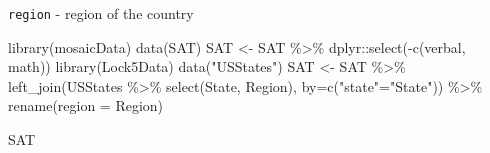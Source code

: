 \documentclass[
  letterpaper,
  DIV=11,
  numbers=noendperiod]{scrreprt}
\newenvironment{Shaded}{\begin{snugshade}}{\end{snugshade}}
\newcommand{\AttributeTok}[1]{\textcolor[rgb]{0.40,0.45,0.13}{#1}}
\newcommand{\FunctionTok}[1]{\textcolor[rgb]{0.28,0.35,0.67}{#1}}
\newcommand{\NormalTok}[1]{\textcolor[rgb]{0.00,0.23,0.31}{#1}}
\newcommand{\OtherTok}[1]{\textcolor[rgb]{0.00,0.23,0.31}{#1}}
\newcommand{\SpecialCharTok}[1]{\textcolor[rgb]{0.37,0.37,0.37}{#1}}
\newcommand{\StringTok}[1]{\textcolor[rgb]{0.13,0.47,0.30}{#1}}
\begin{document}
\texttt{region} - region of the country

\begin{Shaded}
\begin{Highlighting}[]
\FunctionTok{library}\NormalTok{(mosaicData)}
\FunctionTok{data}\NormalTok{(SAT)}
\NormalTok{SAT }\OtherTok{\textless{}{-}}\NormalTok{ SAT }\SpecialCharTok{\%\textgreater{}\%}\NormalTok{ dplyr}\SpecialCharTok{::}\FunctionTok{select}\NormalTok{(}\SpecialCharTok{{-}}\FunctionTok{c}\NormalTok{(verbal, math))}
\FunctionTok{library}\NormalTok{(Lock5Data)}
\FunctionTok{data}\NormalTok{(}\StringTok{"USStates"}\NormalTok{)}
\NormalTok{SAT }\OtherTok{\textless{}{-}}\NormalTok{ SAT }\SpecialCharTok{\%\textgreater{}\%} \FunctionTok{left\_join}\NormalTok{(USStates }\SpecialCharTok{\%\textgreater{}\%} \FunctionTok{select}\NormalTok{(State, Region), }\AttributeTok{by=}\FunctionTok{c}\NormalTok{(}\StringTok{"state"}\OtherTok{=}\StringTok{"State"}\NormalTok{)) }\SpecialCharTok{\%\textgreater{}\%} \FunctionTok{rename}\NormalTok{(}\AttributeTok{region =}\NormalTok{ Region)}
\end{Highlighting}
\end{Shaded}

\begin{Shaded}
\begin{Highlighting}[]
\NormalTok{SAT}
\end{Highlighting}
\end{Shaded}
\end{document}
